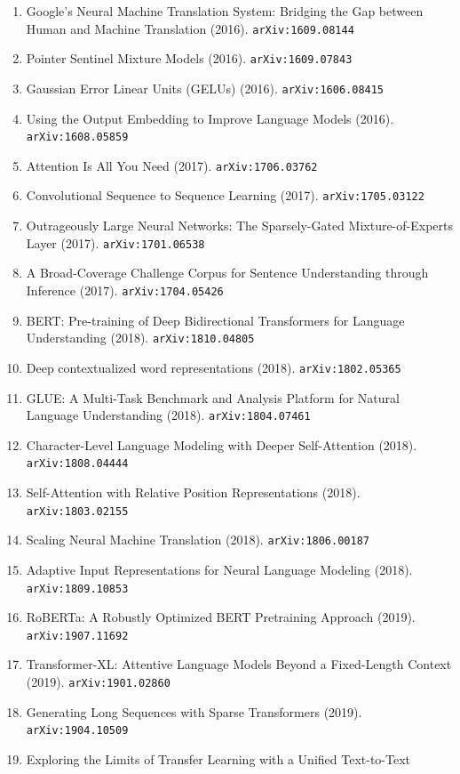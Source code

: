 \documentclass[11pt]{article}
\begin{document}
\begin{enumerate}
  \item Google's Neural Machine Translation System: Bridging the Gap between
  Human and Machine Translation (2016). \texttt{arXiv:1609.08144}
  \item Pointer Sentinel Mixture Models (2016). \texttt{arXiv:1609.07843}
  \item Gaussian Error Linear Units (GELUs) (2016). \texttt{arXiv:1606.08415}
  \item Using the Output Embedding to Improve Language Models (2016). \texttt{arXiv:1608.05859}
  \item Attention Is All You Need (2017). \texttt{arXiv:1706.03762}
  \item Convolutional Sequence to Sequence Learning (2017). \texttt{arXiv:1705.03122}
  \item Outrageously Large Neural Networks: The Sparsely-Gated
  Mixture-of-Experts Layer (2017). \texttt{arXiv:1701.06538}
  \item A Broad-Coverage Challenge Corpus for Sentence Understanding through
  Inference (2017). \texttt{arXiv:1704.05426}
  \item BERT: Pre-training of Deep Bidirectional Transformers for Language
  Understanding (2018). \texttt{arXiv:1810.04805}
  \item Deep contextualized word representations (2018). \texttt{arXiv:1802.05365}
  \item GLUE: A Multi-Task Benchmark and Analysis Platform for Natural Language
  Understanding (2018). \texttt{arXiv:1804.07461}
  \item Character-Level Language Modeling with Deeper Self-Attention (2018). \texttt{arXiv:1808.04444}
  \item Self-Attention with Relative Position Representations (2018). \texttt{arXiv:1803.02155}
  \item Scaling Neural Machine Translation (2018). \texttt{arXiv:1806.00187}
  \item Adaptive Input Representations for Neural Language Modeling (2018). \texttt{arXiv:1809.10853}
  \item RoBERTa: A Robustly Optimized BERT Pretraining Approach (2019). \texttt{arXiv:1907.11692}
  \item Transformer-XL: Attentive Language Models Beyond a Fixed-Length Context (2019). \texttt{arXiv:1901.02860}
  \item Generating Long Sequences with Sparse Transformers (2019). \texttt{arXiv:1904.10509}
  \item Exploring the Limits of Transfer Learning with a Unified Text-to-Text

\end{enumerate}
\end{document}

